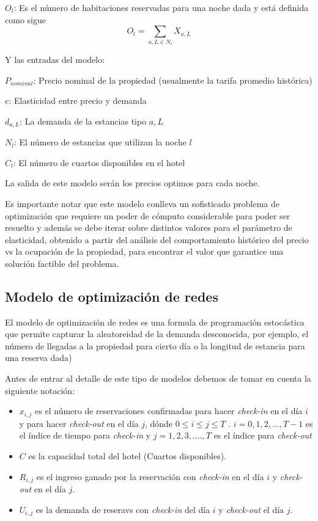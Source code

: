 {{{$O_l$: Es el número de habitaciones reservadas para una noche dada y está definida como sigue $$O_l = \sum_{a,L\in N_l} X_{a,L}$$

Y las entradas del modelo:

$P_{nominal}$: Precio nominal de la propiedad (usualmente la tarifa promedio histórica)

$e$: Elasticidad entre precio y demanda

$d_{a,L}$: La demanda de la estancias tipo $a,L$

$N_l$: El número de estancias que utilizan la noche $l$

$C_l$: El número de cuartos disponibles en el hotel

La salida de este modelo serán los precios optimos para cada noche. 

Es importante notar que este modelo conlleva un sofisticado problema de optimización que requiere un poder de cómputo considerable para poder ser resuelto y además se debe iterar sobre distintos valores para el parámetro de elasticidad, obtenido a partir del análisis del comportamiento histórico del precio vs la ocupación de la propiedad, para encontrar el valor que garantice una solución factible del problema.



 \subsection*{Modelo de optimización de redes}

El modelo de optimización de redes es una formula de programación estocástica que permite capturar la aleatoreidad de la demanda desconocida, por ejemplo, el número de llegadas a la propiedad para cierto día o la longitud de estancia para una reserva dada)

Antes de entrar al detalle de este tipo de modelos debemos de tomar en cuenta la siguiente notación:

\begin{itemize}
  \item $x_{i,j}$ es el número de reservaciones confirmadas para hacer \emph{check-in} en el día $i$ y para hacer \emph{check-out} en el día $j$, dónde $0\leq i \leq j \leq T$ . $i={0,1,2,...,T-1}$ es el índice de tiempo para \emph{check-in} y $j={1,2,3,....,T}$ es el índice para \emph{check-out}
  \item $C$ es la capacidad total del hotel (Cuartos disponibles).
  \item $R_{i,j}$ es el ingreso ganado por la reservación con \emph{check-in} en el día $i$ y \emph{check-out} en el día $j$.
  \item $U_{i,j}$ es la demanda de reseravs con \emph{check-in} del día $i$ y \emph{check-out} el día $j$.
\end{itemize}

}}}
